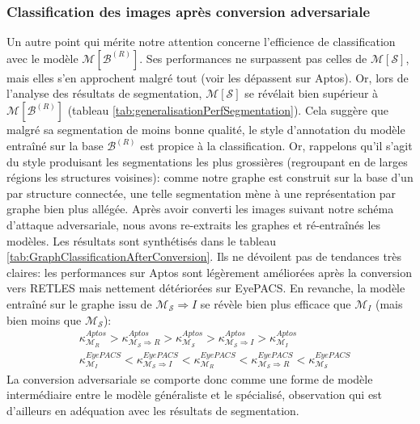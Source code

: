 \subsubsection{Classification des images après conversion adversariale}
Un autre point qui mérite notre attention concerne l'efficience de classification avec le modèle $\mathcal{M}[\mathcal{B}^{(R)}]$. Ses performances ne surpassent pas celles de $\mathcal{M}[\mathcal{S}]$, mais elles s'en approchent malgré tout (voir les dépassent sur Aptos). Or, lors de l'analyse des résultats de segmentation, $\mathcal{M}[\mathcal{S}]$ se révélait bien supérieur à $\mathcal{M}[\mathcal{B}^{(R)}]$ (tableau \ref{tab:generalisationPerfSegmentation}). Cela suggère que malgré sa segmentation de moins bonne qualité, le style d'annotation du modèle entraîné sur la base $\mathcal{B}^{(R)}$ est propice à la classification. Or, rappelons qu'il s'agit du style produisant les segmentations les plus grossières (regroupant en de larges régions les structures voisines): comme notre graphe est construit sur la base d'un \noeud{} par structure connectée, une telle segmentation mène à une représentation par graphe bien plus allégée. Après avoir converti les images suivant notre schéma d'attaque adversariale, nous avons re-extraits les graphes et ré-entraînés les modèles. Les résultats sont synthétisés dans le tableau \ref{tab:GraphClassificationAfterConversion}. Ils ne dévoilent pas de tendances très claires: les performances sur Aptos sont légèrement améliorées après la conversion vers RETLES mais nettement détériorées sur EyePACS. En revanche, la modèle entraîné sur le graphe issu de $\mathcal{M}_\mathcal{S} \Rightarrow I$ se révèle bien plus efficace que $\mathcal{M}_I$ (mais bien moins que $\mathcal{M}_\mathcal{S}$):
\begin{align*}
	& \kappa^{Aptos}_{\mathcal{M}_R} > \kappa^{Aptos}_{\mathcal{M}_\mathcal{S} \Rightarrow R} > \kappa^{Aptos}_{\mathcal{M}_\mathcal{S}} > \kappa^{Aptos}_{\mathcal{M}_\mathcal{S} \Rightarrow I} > \kappa^{Aptos}_{\mathcal{M}_I}\\
	&\kappa^{EyePACS}_{\mathcal{M}_I} < \kappa^{EyePACS}_{\mathcal{M}_\mathcal{S} \Rightarrow I} < \kappa^{EyePACS}_{\mathcal{M}_R} < \kappa^{EyePACS}_{\mathcal{M}_\mathcal{S} \Rightarrow R} < \kappa^{EyePACS}_{\mathcal{M}_\mathcal{S}}
\end{align*}
La conversion adversariale se comporte donc comme une forme de modèle intermédiaire entre le modèle généraliste et le spécialisé, observation qui est d'ailleurs en adéquation avec les résultats de segmentation. 
